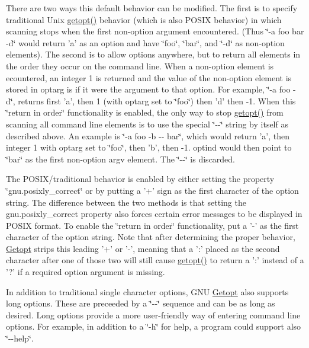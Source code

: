 There are two ways this default behavior can be modified. The first is to specify traditional Unix \hyperlink{classgnu_1_1getopt_1_1_getopt_a49e6fc6e18756f5dfaf85c1067325c3b}{getopt()} behavior (which is also POSIX behavior) in which scanning stops when the first non-\/option argument encountered. (Thus \char`\"{}-\/a foo bar -\/d\char`\"{} would return 'a' as an option and have \char`\"{}foo\char`\"{}, \char`\"{}bar\char`\"{}, and \char`\"{}-\/d\char`\"{} as non-\/option elements). The second is to allow options anywhere, but to return all elements in the order they occur on the command line. When a non-\/option element is ecountered, an integer 1 is returned and the value of the non-\/option element is stored in optarg is if it were the argument to that option. For example, \char`\"{}-\/a foo -\/d\char`\"{}, returns first 'a', then 1 (with optarg set to \char`\"{}foo\char`\"{}) then 'd' then -\/1. When this \char`\"{}return in order\char`\"{} functionality is enabled, the only way to stop \hyperlink{classgnu_1_1getopt_1_1_getopt_a49e6fc6e18756f5dfaf85c1067325c3b}{getopt()} from scanning all command line elements is to use the special \char`\"{}-\/-\/\char`\"{} string by itself as described above. An example is \char`\"{}-\/a foo -\/b -\/-\/ bar\char`\"{}, which would return 'a', then integer 1 with optarg set to \char`\"{}foo\char`\"{}, then 'b', then -\/1. optind would then point to \char`\"{}bar\char`\"{} as the first non-\/option argv element. The \char`\"{}-\/-\/\char`\"{} is discarded. 

The POSIX/traditional behavior is enabled by either setting the property \char`\"{}gnu.posixly\_\-correct\char`\"{} or by putting a '+' sign as the first character of the option string. The difference between the two methods is that setting the gnu.posixly\_\-correct property also forces certain error messages to be displayed in POSIX format. To enable the \char`\"{}return in order\char`\"{} functionality, put a '-\/' as the first character of the option string. Note that after determining the proper behavior, \hyperlink{classgnu_1_1getopt_1_1_getopt}{Getopt} strips this leading '+' or '-\/', meaning that a ':' placed as the second character after one of those two will still cause \hyperlink{classgnu_1_1getopt_1_1_getopt_a49e6fc6e18756f5dfaf85c1067325c3b}{getopt()} to return a ':' instead of a '?' if a required option argument is missing. 

In addition to traditional single character options, GNU \hyperlink{classgnu_1_1getopt_1_1_getopt}{Getopt} also supports long options. These are preceeded by a \char`\"{}-\/-\/\char`\"{} sequence and can be as long as desired. Long options provide a more user-\/friendly way of entering command line options. For example, in addition to a \char`\"{}-\/h\char`\"{} for help, a program could support also \char`\"{}-\/-\/help\char`\"{}. 

